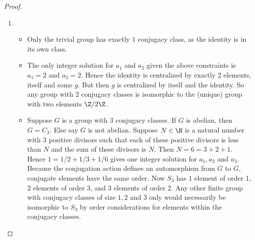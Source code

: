 \documentclass[onesided]{ccg-pset}
\begin{document}
\begin{enumerate}
\begin{proof}
\begin{enumerate}
        \item 
          \begin{itemize}
              \item Only the trivial group has exactly $1$ conjugacy class, as the identity is in its own class.
              \item The only integer solution for $a_1$ and $a_2$ given the above constraints is $a_1 = 2$ and $a_2 = 2$. Hence the identity is centralized by exactly $2$ elements, itself and some $g$. But then $g$ is centralized by itself and the identity. So any group with $2$ conjugacy classes is isomorphic to the (unique) group with two elements $\Z/2\Z$.
              \item Suppose $G$ is a group with $3$ conjugacy classes. If $G$ is abelian, then $G = C_3$. Else say $G$ is not abelian. Suppose $N \in \N$ is a natural number with $3$ positive divisors such that each of these positive divisors is less than $N$ and the sum of these divisors is $N$. Then $N = 6 = 3 + 2 + 1$. Hence $1 = 1/2 + 1/3 + 1/6$ gives one integer solution for $a_1, a_2$ and $a_3$. Because the conjugation action defines an automorphism from $G$ to $G$, conjugate elements have the same order. Now $S_3$ has $1$ element of order $1$, $2$ elements of order $3$, and $3$ elements of order $2$. Any other finite group with conjugacy classes of size $1, 2$ and $3$ only would necessarily be isomorphic to $S_3$ by order considerations for elements within the conjugacy classes.
          \end{itemize}
    \end{enumerate}
    \end{proof}
\end{enumerate}
\end{document}
